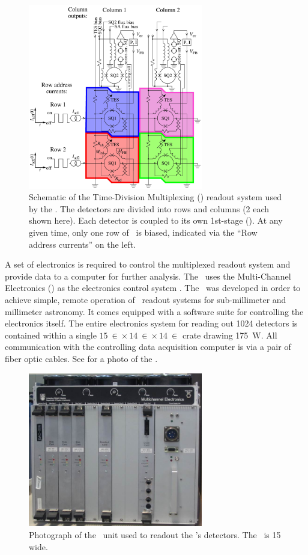 \begin{figure}
\centering
\includegraphics[width=3in]{images/ch4-tdm-schematic.png}
\caption[Time-Division Multiplexing Schematic]{
  Schematic of the Time-Division Multiplexing (\TDM) readout system used by the \Imager.
  The detectors are divided into rows and columns (2 each shown here).
  Each detector is coupled to its own 1st-stage \SQUID ().
  At any given time, only one row of \SQUIDs\ is biased, indicated via the ``Row address currents'' on the left.
}
\label{fig:ch4-tdm-schematic}
\end{figure}

A set of electronics is required to control the multiplexed readout system and provide data to a computer for further analysis.
The \Imager\ uses the Multi-Channel Electronics (\MCE) as the electronics control system \cite{battistelli_functional_2008,battistelli_automated_2008,_mcewiki_2014}.
The \MCE\ was developed in order to achieve simple, remote operation of \TDM\ readout systems for sub-millimeter and millimeter astronomy.
It comes equipped with a software suite for controlling the electronics itself.
The entire electronics system for reading out 1024 detectors is contained within a single $\SI{15}{\in} \times \SI{14}{\in} \times \SI{14}{\in}$ crate drawing \SI{175}{\W}.
All communication with the controlling data acquisition computer is via a pair of fiber optic cables.
See  for a photo of the \MCE.

\begin{figure}
\centering
\includegraphics[width=3in]{images/ch4-mce.jpg}
\caption[Photograph of the \MCE]{
  Photograph of the \MCE\ unit used to readout the \Imager's detectors.
  The \MCE\ is \SI{15}{\in} wide.
}
\label{fig:ch4-mce-photo}
\end{figure}

